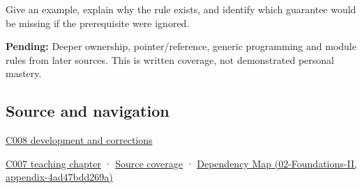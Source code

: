 Give an example, explain why the rule exists, and identify which guarantee would be missing if the prerequisite were ignored.

\textbf{Pending:} Deeper ownership, pointer/reference, generic programming and module rules from later sources. This is written coverage, not demonstrated personal mastery.

\subsection{Source and navigation}\label{appendix-b12b31759da1-source-and-navigation}

\hyperref[appendix-fd090d982a15-m008---parts-113-126]{C008 development and corrections}

\hyperref[01-foundations-i-ch002-a-spelling-needs-a-place-and-a-meaning]{C007 teaching chapter} · \hyperref[appendix-fd090d982a15-m007---parts-101-112]{Source coverage} · \href{../02-Foundations-II/main.pdf\#nameddest=appendix-4ad47bdd269a}{Dependency Map (02-Foundations-II, appendix-4ad47bdd269a)}
